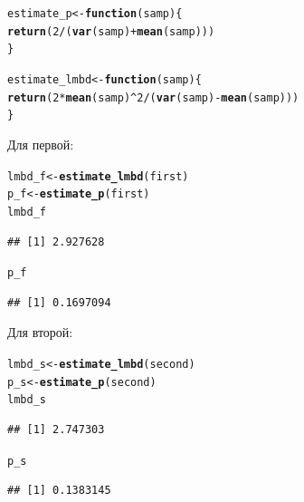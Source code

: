 \documentclass{article}\usepackage[]{graphicx}\usepackage[]{color}
\makeatletter
\newcommand{\hlnum}[1]{\textcolor[rgb]{0.686,0.059,0.569}{#1}}%
\newcommand{\hlopt}[1]{\textcolor[rgb]{0,0,0}{#1}}%
\newcommand{\hlstd}[1]{\textcolor[rgb]{0.345,0.345,0.345}{#1}}%
\newcommand{\hlkwa}[1]{\textcolor[rgb]{0.161,0.373,0.58}{\textbf{#1}}}%
\newcommand{\hlkwb}[1]{\textcolor[rgb]{0.69,0.353,0.396}{#1}}%
\newcommand{\hlkwc}[1]{\textcolor[rgb]{0.333,0.667,0.333}{#1}}%
\newcommand{\hlkwd}[1]{\textcolor[rgb]{0.737,0.353,0.396}{\textbf{#1}}}%
\newenvironment{kframe}{%
 \def\at@end@of@kframe{}%
 \ifinner\ifhmode%
  \def\at@end@of@kframe{\end{minipage}}%
  \begin{minipage}{\columnwidth}%
 \fi\fi%
 \def\FrameCommand##1{\hskip\@totalleftmargin \hskip-\fboxsep
 \colorbox{shadecolor}{##1}\hskip-\fboxsep
     \hskip-\linewidth \hskip-\@totalleftmargin \hskip\columnwidth}%
 \MakeFramed {\advance\hsize-\width
   \@totalleftmargin\z@ \linewidth\hsize
   \@setminipage}}%
 {\par\unskip\endMakeFramed%
 \at@end@of@kframe}
\newenvironment{knitrout}{}{} %
\makeatother
\begin{document}
\begin{knitrout}
\color{fgcolor}\begin{kframe}
\begin{alltt}
\hlstd{estimate_p} \hlkwb{<-} \hlkwa{function}\hlstd{(}\hlkwc{samp}\hlstd{)\{}
  \hlkwd{return}\hlstd{(}\hlnum{2} \hlopt{/} \hlstd{(}\hlkwd{var}\hlstd{(samp)} \hlopt{+} \hlkwd{mean}\hlstd{(samp)))}
\hlstd{\}}

\hlstd{estimate_lmbd} \hlkwb{<-} \hlkwa{function}\hlstd{(}\hlkwc{samp}\hlstd{)\{}
  \hlkwd{return}\hlstd{(} \hlnum{2} \hlopt{*} \hlkwd{mean}\hlstd{(samp)}\hlopt{^}\hlnum{2} \hlopt{/} \hlstd{(}\hlkwd{var}\hlstd{(samp)} \hlopt{-} \hlkwd{mean}\hlstd{(samp)))}
\hlstd{\}}
\end{alltt}
\end{kframe}
\end{knitrout}


Для первой:
\begin{knitrout}
\color{fgcolor}\begin{kframe}
\begin{alltt}
\hlstd{lmbd_f} \hlkwb{<-} \hlkwd{estimate_lmbd}\hlstd{(first)}
\hlstd{p_f} \hlkwb{<-} \hlkwd{estimate_p}\hlstd{(first)}
\hlstd{lmbd_f}
\end{alltt}
\begin{verbatim}
## [1] 2.927628
\end{verbatim}
\begin{alltt}
\hlstd{p_f}
\end{alltt}
\begin{verbatim}
## [1] 0.1697094
\end{verbatim}
\end{kframe}
\end{knitrout}
Для второй:
\begin{knitrout}
\color{fgcolor}\begin{kframe}
\begin{alltt}
\hlstd{lmbd_s} \hlkwb{<-} \hlkwd{estimate_lmbd}\hlstd{(second)}
\hlstd{p_s} \hlkwb{<-} \hlkwd{estimate_p}\hlstd{(second)}
\hlstd{lmbd_s}
\end{alltt}
\begin{verbatim}
## [1] 2.747303
\end{verbatim}
\begin{alltt}
\hlstd{p_s}
\end{alltt}
\begin{verbatim}
## [1] 0.1383145
\end{verbatim}
\end{kframe}
\end{knitrout}
\end{document}
